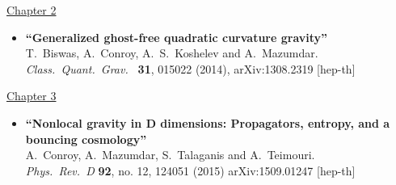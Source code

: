 \begin{pubs}
%
\underline{Chapter 2}
\begin{itemize}
\item%
{\bf ``Generalized ghost-free quadratic curvature gravity''}
  \\{}T.~Biswas, A.~Conroy, A.~S.~Koshelev and A.~Mazumdar.
  \\{}\emph{ Class.\ Quant.\ Grav.\ }  {\bf 31}, 015022 (2014),  {}arXiv:1308.2319 [hep-th]
\end{itemize}
\underline{Chapter 3}
\begin{itemize}
\item%
{\bf ``Nonlocal gravity in D dimensions: Propagators, entropy, and a bouncing cosmology''}
  \\{}A.~Conroy, A.~Mazumdar, S.~Talaganis and A.~Teimouri.
  \\
  {}\emph{Phys.\ Rev.\ D } {\bf 92}, no. 12, 124051 (2015) {}arXiv:1509.01247 [hep-th]


\end{itemize}
\end{pubs}
